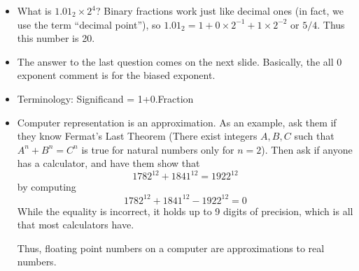 \begin{frame}[fragile]
\begin{itemize}
\end{itemize}
\BNotes\ifnum{}
\begin{itemize}
\item
What is $1.01_2 \times 2^4$? Binary fractions work just like decimal
ones (in fact, we use the term ``decimal point''), so $1.01_2 = 1 + 0
\times 2^{-1} + 1 \times 2^{-2}$ or $5/4$. Thus this number is 20.
\item The answer to the last question comes on the next slide.
	Basically, the all 0 exponent comment is for the biased
	exponent.
\item Terminology: Significand = 1+0.Fraction
\item Computer representation is an approximation.  As an example, ask them
	if they know Fermat's Last Theorem (There exist integers $A,B,C$
	such that $A^n+B^n=C^n$ is true for natural numbers only for $n=2$).
	Then ask if anyone has a calculator, and have them show that
	\[
		1782^{12} + 1841^{12} = 1922^{12}
	\]
	by computing
	\[
		1782^{12} + 1841^{12} - 1922^{12} = 0
	\]
	While the equality is incorrect, it holds up to 9 digits of precision,
	which is all that most calculators have.

	Thus, floating point numbers on a computer are approximations to 
	real numbers.
\end{itemize}
\fi\ENotes
\end{frame}


